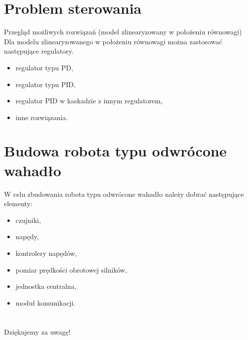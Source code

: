 \section{Problem sterowania}
\begin{frame}{Przegląd możliwych rozwiązań (model zlinearyzowany w położeniu równowagi)}
Dla modelu zlinearyzowanego w położeniu równowagi można zastosować następujące regulatory.
	\begin{itemize}
		\item regulator typu PD, \pause
		\item regulator typu PID, \pause 
		\item regulator PID w kaskadzie z innym regulatorem, \pause
		\item inne rozwiązania.
	\end{itemize}
\end{frame}

\section{Budowa robota typu odwrócone wahadło}
	\begin{frame}{}
	W celu zbudowania robota typu odwrócone wahadło należy
	dobrać następujące elementy:
		\begin{itemize}
			\item czujniki,   \pause
			\item napędy,     \pause
			\item kontrolery napędów,  \pause
			\item pomiar prędkości obrotowej silników,    \pause
			\item jednostka centralna,   \pause
			\item moduł komunikacji.
		\end{itemize}
	\end{frame}


\section{}
\begin{frame}
  \begin{center}
    \huge
    Dziękujemy za uwagę!
  \end{center}
 

\end{frame}



